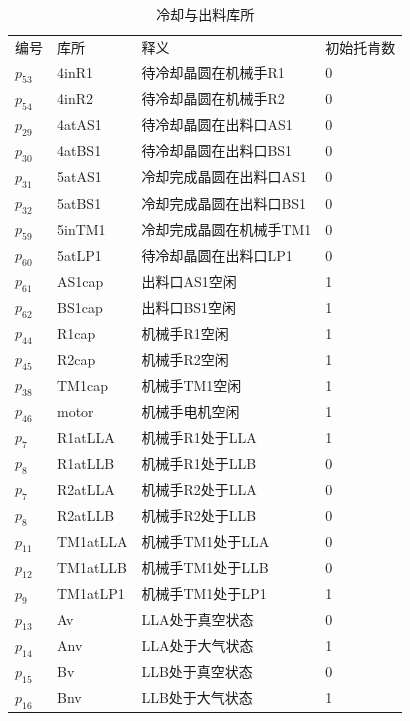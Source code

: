\begin{table}[H]
	\centering
	\caption{冷却与出料库所}
	\begin{tabular}{llll}
		\toprule
		编号 & 库所     & 释义                    & 初始托肯数 \\
		$p_{53}$  & 4inR1    & 待冷却晶圆在机械手R1    & 0          \\
		$p_{54}$  & 4inR2    & 待冷却晶圆在机械手R2    & 0          \\
		$p_{29}$  & 4atAS1   & 待冷却晶圆在出料口AS1   & 0          \\
		$p_{30}$  & 4atBS1   & 待冷却晶圆在出料口BS1   & 0          \\
		$p_{31}$  & 5atAS1   & 冷却完成晶圆在出料口AS1 & 0          \\
		$p_{32}$  & 5atBS1   & 冷却完成晶圆在出料口BS1 & 0          \\
		$p_{59}$  & 5inTM1   & 冷却完成晶圆在机械手TM1 & 0          \\
		$p_{60}$  & 5atLP1   & 待冷却晶圆在出料口LP1   & 0          \\
		$p_{61}$  & AS1cap   & 出料口AS1空闲           & 1          \\
		$p_{62}$  & BS1cap   & 出料口BS1空闲           & 1          \\
		$p_{44}$  & R1cap    & 机械手R1空闲            & 1          \\
		$p_{45}$  & R2cap    & 机械手R2空闲            & 1          \\
		$p_{38}$  & TM1cap   & 机械手TM1空闲           & 1          \\
		$p_{46}$  & motor    & 机械手电机空闲          & 1          \\
		$p_{7}$   & R1atLLA  & 机械手R1处于LLA         & 1          \\
		$p_{8}$   & R1atLLB  & 机械手R1处于LLB         & 0          \\
		$p_{7}$   & R2atLLA  & 机械手R2处于LLA         & 0          \\
		$p_{8}$   & R2atLLB  & 机械手R2处于LLB         & 0          \\
		$p_{11}$  & TM1atLLA & 机械手TM1处于LLA        & 0          \\
		$p_{12}$  & TM1atLLB & 机械手TM1处于LLB        & 0          \\
		$p_{9}$   & TM1atLP1 & 机械手TM1处于LP1        & 1          \\
		$p_{13}$  & Av       & LLA处于真空状态         & 0          \\
		$p_{14}$  & Anv      & LLA处于大气状态         & 1          \\
		$p_{15}$  & Bv       & LLB处于真空状态         & 0          \\
		$p_{16}$  & Bnv      & LLB处于大气状态         & 1          \\
		\bottomrule
	\end{tabular}
\end{table}


